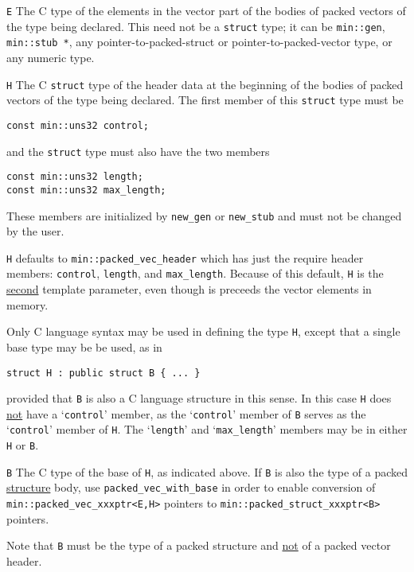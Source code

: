 \documentclass[12pt]{article}
\newcommand{\EOL}{\penalty \exhyphenpenalty}
\newcommand{\BRACKETED}[1]{{\tt <#1>}}
\newenvironment{indpar}[1][0.3in]%
	{\begin{list}{}%
		     {\setlength{\itemsep}{0in}%
		      \setlength{\topsep}{0in}%
		      \setlength{\parsep}{1ex}%
		      \setlength{\labelwidth}{#1}%
		      \setlength{\leftmargin}{#1}%
		      \addtolength{\leftmargin}{\labelsep}}%
	 \item}%
	{\end{list}}
\newenvironment{itemlist}[1][1.2in]%
	{\begin{list}{}{\setlength{\labelwidth}{#1}%
		        \setlength{\leftmargin}{\labelwidth}%
		        \addtolength{\leftmargin}{+0.2in}%
		        \renewcommand{\makelabel}[1]{##1\hfill}}}%
	{\end{list}}
\begin{document}
\begin{itemlist}[0.5in]

\item[{\tt E}]\label{PACKED_VEC_ELEMENT_TYPE}
The C type of the elements in the vector part of the
bodies of packed vectors of the type being
declared.  This need not be a \verb|struct| type; it can
be \verb|min::gen|, \verb|min::stub *|,
any pointer-to-packed-struct or pointer-to-packed-vector
type, or any numeric type.

\item[{\tt H}]\label{PACKED_VEC_HEADER_TYPE}
The C \verb|struct| type of the header data at the beginning of the
bodies of packed vectors of the type being
declared.  The first member of this \verb|struct| type must be
\begin{indpar}
\verb|const min::uns32 control;|
\end{indpar}
and the \verb|struct| type must also have the two members
\begin{indpar}
\verb|const min::uns32 length;| \\
\verb|const min::uns32 max_length;|
\end{indpar}
These members are initialized by \verb|new_gen| or \verb|new_stub|
and must not
be changed by the user.

\verb|H| defaults to \verb|min::packed_vec_header| which
has just the require header members: \verb|control|, \verb|length|, and
{\tt max\_\EOL length}.  Because of this default,
\verb|H| is the \underline{second} template parameter,
even though is preceeds the vector elements in memory.

Only C language syntax may be used in defining the type {\tt H},
except that a single base type may be be used, as in
\begin{indpar}\begin{verbatim}
struct H : public struct B { ... }
\end{verbatim}\end{indpar}
provided that {\tt B} is also a C language structure in this sense.
In this case {\tt H} does
\underline{not} have a `{\tt control}' member, as
the `{\tt control}' member of {\tt B} serves as
the `{\tt control}' member of {\tt H}.  The `{\tt length}' and
`{\tt max\_length}' members may be in either {\tt H} or {\tt B}.

\item[{\tt B}]
The C type of the base of {\tt H}, as indicated above.  If {\tt B}
is also the type of a packed \underline{structure} body, use
{\tt packed\_\EOL vec\_\EOL with\_\EOL base\BRACKETED{E,H,B}}
in order to enable conversion of
{\tt min::\EOL packed\_\EOL vec\_\EOL xxxptr<E,H>} pointers
to {\tt min::\EOL packed\_\EOL struct\_\EOL xxxptr<B>}
pointers.

Note that {\tt B} must be the type of a packed
structure and \underline{not} of a packed vector header.

\end{itemlist}
\end{document}
